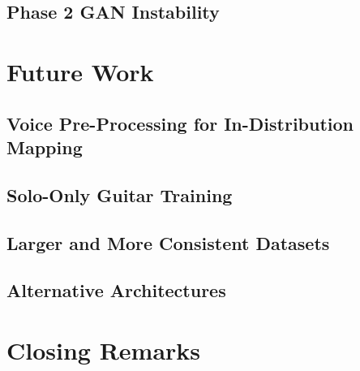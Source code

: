 \subsection{Phase 2 GAN Instability}

\section{Future Work}
\label{sec:conclusions_future}

\subsection{Voice Pre-Processing for In-Distribution Mapping}

\subsection{Solo-Only Guitar Training}

\subsection{Larger and More Consistent Datasets}

\subsection{Alternative Architectures}

\section{Closing Remarks}
\label{sec:conclusions_closing}

